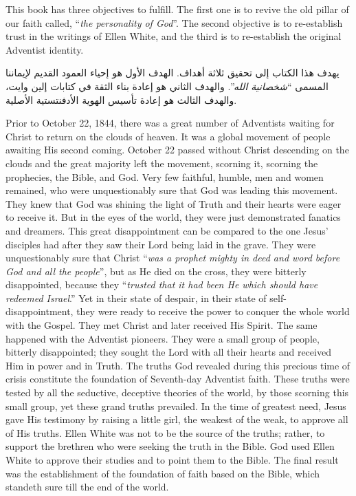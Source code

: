







This book has three objectives to fulfill. The first one is to revive the old pillar of our faith called, “\textit{the personality of God}”. The second objective is to re-establish trust in the writings of Ellen White, and the third is to re-establish the original Adventist identity.


يهدف هذا الكتاب إلى تحقيق ثلاثة أهداف. الهدف الأول هو إحياء العمود القديم لإيماننا المسمى “\textit{شخصانية الله}”. والهدف الثاني هو إعادة بناء الثقة في كتابات إلين وايت، والهدف الثالث هو إعادة تأسيس الهوية الأدفنتستية الأصلية.


Prior to October 22, 1844, there was a great number of Adventists waiting for Christ to return on the clouds of heaven. It was a global movement of people awaiting His second coming. October 22 passed without Christ descending on the clouds and the great majority left the movement, scorning it, scorning the prophecies, the Bible, and God. Very few faithful, humble, men and women remained, who were unquestionably sure that God was leading this movement. They knew that God was shining the light of Truth and their hearts were eager to receive it. But in the eyes of the world, they were just demonstrated fanatics and dreamers. This great disappointment can be compared to the one Jesus’ disciples had after they saw their Lord being laid in the grave. They were unquestionably sure that Christ “\textit{was a prophet mighty in deed and word before God and all the people}”, but as He died on the cross, they were bitterly disappointed, because they “\textit{trusted that it had been He which should have redeemed Israel}.” Yet in their state of despair, in their state of self-disappointment, they were ready to receive the power to conquer the whole world with the Gospel. They met Christ and later received His Spirit. The same happened with the Adventist pioneers. They were a small group of people, bitterly disappointed; they sought the Lord with all their hearts and received Him in power and in Truth. The truths God revealed during this precious time of crisis constitute the foundation of Seventh-day Adventist faith. These truths were tested by all the seductive, deceptive theories of the world, by those scorning this small group, yet these grand truths prevailed. In the time of greatest need, Jesus gave His testimony by raising a little girl, the weakest of the weak, to approve all of His truths. Ellen White was not to be the source of the truths; rather, to support the brethren who were seeking the truth in the Bible. God used Ellen White to approve their studies and to point them to the Bible. The final result was the establishment of the foundation of faith based on the Bible, which standeth sure till the end of the world.


